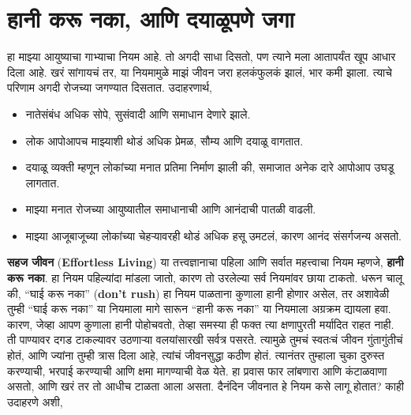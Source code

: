 \chapter{हानी करू नका, आणि दयाळूपणे जगा}
हा माझ्या आयुष्याचा गाभ्याचा नियम आहे. तो अगदी साधा दिसतो, पण त्याने मला आतापर्यंत खूप आधार दिला आहे. खरं सांगायचं तर, या नियमामुळे माझं जीवन जरा हलकंफुलकं झालं, भार कमी झाला. त्याचे परिणाम अगदी रोजच्या जगण्यात दिसतात. उदाहरणार्थ, 
\begin{itemize}
 \item नातेसंबंध अधिक सोपे, सुसंवादी आणि समाधान देणारे झाले.
 \item लोक आपोआपच माझ्याशी थोडं अधिक प्रेमळ, सौम्य आणि दयाळू वागतात.
 \item दयाळू व्यक्ती म्हणून लोकांच्या मनात प्रतिमा निर्माण झाली की, समाजात अनेक दारे आपोआप उघडू लागतात.
 \item माझ्या मनात रोजच्या आयुष्यातील समाधानाची आणि आनंदाची पातळी वाढली.
 \item माझ्या आजूबाजूच्या लोकांच्या चेहऱ्यावरही थोडं अधिक हसू उमटलं, कारण आनंद संसर्गजन्य असतो.
 \end{itemize}
\textbf{सहज जीवन} (\textbf {Effortless Living}) या तत्त्वज्ञानाचा पहिला आणि सर्वात महत्त्वाचा नियम म्हणजे,  \textbf{हानी करू नका}. हा नियम पहिल्यांदा मांडला जातो, कारण तो उरलेल्या सर्व नियमांवर छाया टाकतो. धरून चालू की, “घाई करू नका” (\textbf {don’t rush}) हा नियम पाळताना कुणाला हानी होणार असेल, तर अशावेळी तुम्ही “घाई करू नका” या नियमाला मागे सारून “हानी करू नका” या नियमाला अग्रक्रम द्यायला हवा.
कारण, जेव्हा आपण कुणाला हानी पोहोचवतो, तेव्हा समस्या ही फक्त त्या क्षणापुरती मर्यादित राहत नाही. ती पाण्यावर दगड टाकल्यावर उठणाऱ्या वलयांसारखी सर्वत्र पसरते. त्यामुळे तुमचं स्वतःचं जीवन गुंतागुंतीचं होतं, आणि ज्यांना तुम्ही त्रास दिला आहे, त्यांचं जीवनसुद्धा कठीण होतं. त्यानंतर तुम्हाला चुका दुरुस्त करण्याची, भरपाई करण्याची आणि क्षमा मागण्याची वेळ येते. हा प्रवास फार लांबणारा आणि कंटाळवाणा असतो, आणि खरं तर तो आधीच टाळता आला असता.
दैनंदिन जीवनात हे नियम कसे लागू होतात? काही उदाहरणे अशी, 
